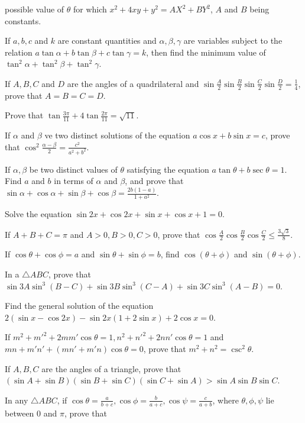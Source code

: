   possible value of $\theta$ for which $x^2 + 4xy + y^2 = AX^2 + BY^2$, $A$ and $B$ being constants.
\item If $a, b, c$ and $k$ are constant quantities and $\alpha, \beta, \gamma$ are variables subject to the
  relation $a\tan\alpha + b\tan\beta + c\tan\gamma = k$, then find the minimum value of $\tan^2\alpha
  + \tan^2\beta + \tan^2\gamma$.
\item If $A, B, C$ and $D$ are the angles of a quadrilateral and
  $\sin\frac{A}{2}\sin\frac{B}{2}\sin\frac{C}{2}\sin\frac{D}{2} = \frac{1}{4}$, prove that $A = B = C = D$.
\item Prove that $\tan\frac{3\pi}{11} + 4\tan\frac{2\pi}{11} = \sqrt{11}$.
\item If $\alpha$ and $\beta$ ve two distinct solutions of the equation $a\cos x + b\sin x = c$, prove that
  $\cos^2\frac{\alpha - \beta}{2} = \frac{c^2}{a^2 + b^2}$.
\item If $\alpha, \beta$ be two distinct values of $\theta$ satisfying the equation $a\tan\theta +
  b\sec\theta = 1$. Find $a$ and $b$ in terms of $\alpha$ and $\beta$, and prove that $\sin\alpha
  + \cos\alpha + \sin\beta + \cos\beta = \frac{2b(1 - a)}{1 + a^2}$.
\item Solve the equation $\sin2x + \cos2x + \sin x + \cos x + 1 = 0$.
\item If $A + B + C = \pi$ and $A > 0, B > 0, C > 0$, prove that
  $\cos\frac{A}{2}\cos\frac{B}{2}\cos\frac{C}{2}\leq \frac{3\sqrt{3}}{8}$.
\item If $\cos\theta + \cos\phi = a$ and $\sin\theta + \sin\phi = b$, find $\cos(\theta + \phi)$ and
  $\sin(\theta + \phi)$.
\item In a $\triangle ABC$, prove that $\sin3A\sin^3(B - C) + \sin3B\sin^3(C - A) + \sin3C\sin^3(A - B) =
  0$.
\item Find the general solution of the equation $2(\sin x - \cos2x) - \sin2x(1 + 2\sin x) + 2\cos x = 0$.
\item If $m^2 + {m'}^2 + 2mm'\cos\theta = 1, n^2 + {n'}^2 + 2nn'\cos\theta = 1$ and $mn + m'n' + \left(mn'
  + m'n\right)\cos\theta = 0$, prove that $m^2 + n^2 = \csc^2\theta$.
\item If $A, B, C$ are the angles of a triangle, prove that $(\sin A + \sin B)(\sin B + \sin C)(\sin C
  + \sin A) > \sin A\sin B\sin C$.
\item In any $\triangle ABC$, if $\cos\theta = \frac{a}{b + c}, \cos\phi = \frac{b}{a + c}, \cos\psi
  = \frac{c}{a + b}$, where $\theta, \phi, \psi$ lie between $0$ and $\pi$, prove that
